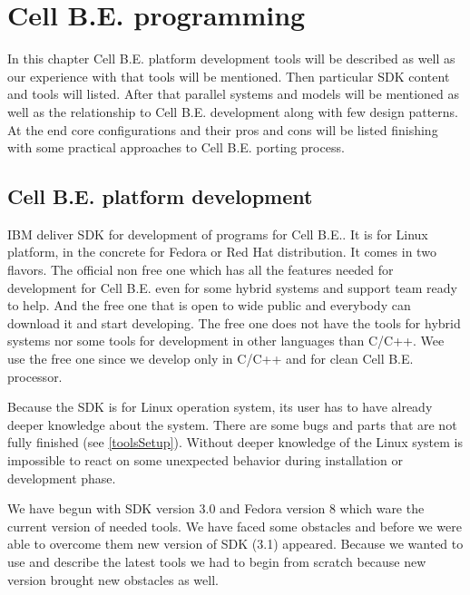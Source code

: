\chapter {Cell B.E. programming}
\par
In this chapter Cell B.E. platform development tools will be described as well as our experience with that tools will be mentioned.
Then particular SDK content and tools will listed.
After that parallel systems and models will be mentioned as well as the relationship to Cell B.E. development along with few design patterns.
At the end core configurations and their pros and cons will be listed finishing with some practical approaches to Cell B.E. porting process.

\section{Cell B.E. platform development}
\par
IBM deliver SDK for development of programs for Cell B.E..
It is for Linux platform, in the concrete for Fedora or Red Hat distribution.
It comes in two flavors.
The official non free one which has all the features needed for development for Cell B.E. even for some hybrid systems and support team ready to help.
And the free one that is open to wide public and everybody can download it and start developing.
The free one does not have the tools for hybrid systems nor some tools for development in other languages than C/C++.
Wee use the free one since we develop only in C/C++ and for clean Cell B.E. processor.

\par
Because the SDK is for Linux operation system, its user has to have already deeper knowledge about the system.
There are some bugs and parts that are not fully finished (see \ref{toolsSetup}).
Without deeper knowledge of the Linux system is impossible to react on some unexpected behavior during installation or development phase.

\par
We have begun with SDK version 3.0 and Fedora version 8 which ware the current version of needed tools.
We have faced some obstacles and before we were able to overcome them new version of SDK (3.1) appeared.
Because we wanted to use and describe the latest tools we had to begin from scratch because new version brought new obstacles as well.

